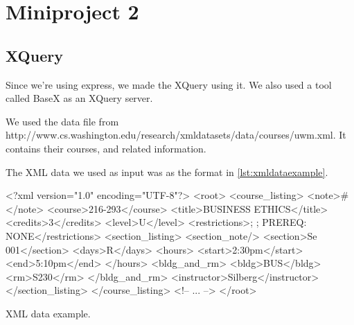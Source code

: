 \chapter{Miniproject 2}
\section{XQuery}

Since we’re using express, we made the XQuery using it. We also used a tool called BaseX as an XQuery server.

We used the data file from http://www.cs.washington.edu/research/xmldatasets/data/courses/uwm.xml.
It contains their courses, and related information.

The XML data we used as input was as the format in \cref{lst:xmldataexample}.

\begin{listing}
    \begin{xmlblock}
        <?xml version="1.0" encoding="UTF-8"?>
        <root>
            <course_listing>
                <note>#</note>
                <course>216-293</course>
                <title>BUSINESS ETHICS</title>
                <credits>3</credits>
                <level>U</level>
                <restrictions>; ; PREREQ: NONE</restrictions>
                <section_listing>
                    <section_note/>
                    <section>Se 001</section>
                    <days>R</days>
                    <hours>
                        <start>2:30pm</start>
                        <end>5:10pm</end>
                    </hours>
                    <bldg_and_rm>
                    <bldg>BUS</bldg>
                    <rm>S230</rm>
                    </bldg_and_rm>
                    <instructor>Silberg</instructor>
                </section_listing>
            </course_listing>
            <!-- ... -->
        </root>
    \end{xmlblock}
    \caption{XML data example.}
    \label{lst:xmldataexample}
\end{listing}

